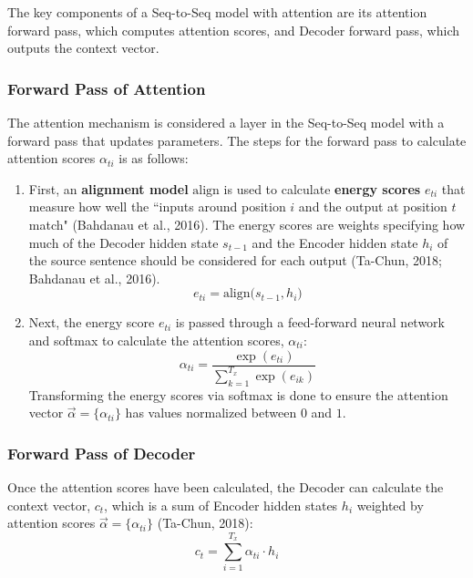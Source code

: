The key components of a Seq-to-Seq model with attention are its attention forward pass, which computes attention scores, and Decoder forward pass, which outputs the context vector. 

\subsubsection{Forward Pass of Attention}

The attention mechanism is considered a layer in the Seq-to-Seq model with a forward pass that updates parameters. The steps for the forward pass to calculate attention scores $\alpha_{ti}$ is as follows: 
\begin{enumerate}
    \item First, an \textbf{alignment model} $\text{align}$ is used to calculate \textbf{energy scores} $e_{ti}$ that measure how well the ``inputs around position $i$ and the output at position $t$ match" (Bahdanau et al., 2016). The energy scores are weights specifying how much of the Decoder hidden state $s_{t-1}$ and the Encoder hidden state $h_i$ of the source sentence should be considered for each output (Ta-Chun, 2018; Bahdanau et al., 2016). 
    $$
    e_{ti} = \text{align} \Big(s_{t-1}, h_i \Big)
    $$ 
    
    \item Next, the energy score $e_{ti}$ is passed through a feed-forward neural network and softmax to calculate the attention scores, $\alpha_{ti}$:
    $$
    \alpha_{ti} = \frac{\exp{(e_{ti})} } { \sum_{k=1}^{T_x} \exp{(e_{ik})} }
    $$
    Transforming the energy scores via softmax is done to ensure the attention vector $\overrightarrow{\alpha} = \Big \{ \alpha_{ti} \Big \}$ has values normalized between $0$ and $1$. 
\end{enumerate}



\subsubsection{Forward Pass of Decoder}

Once the attention scores have been calculated, the Decoder can calculate the context vector, $c_t$, which is a sum of Encoder hidden states $h_i$ weighted by attention scores $\overrightarrow{\alpha} = \Big \{ \alpha_{ti} \Big \}$ (Ta-Chun, 2018): 
$$
c_t = \sum_{i=1}^{T_x} \alpha_{ti} \cdot h_i
$$

